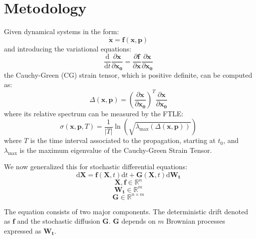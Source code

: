 \documentclass{juliacon}
\newcommand{\drv}{\textrm{d}}
\begin{document}
\section{Metodology}
Given dynamical systems in the form:
\begin{equation}
    \dot{\mathbf{x}}=\mathbf{f}(\mathbf{x}, \mathbf{p})
\end{equation}
and introducing the variational equations:
\begin{equation}
    \frac{\drv}{\drv t} \frac{\partial \mathbf{x} }{\partial \mathbf{x_0}} = \frac{\partial \mathbf{f}}{\partial \mathbf{x}}\frac{\partial \mathbf{x}}{\partial \mathbf{x_0}}
\end{equation}
the Cauchy-Green (CG) strain tensor, which is positive definite, can be computed as:
\begin{equation}
    \Delta(\mathbf{x}, \mathbf{p}) = \left( \frac{\partial \mathbf{x}}{\partial \mathbf{x_0}}\right)^T \frac{\partial \mathbf{x}}{\partial \mathbf{x_0}}
\end{equation}
where its relative spectrum can be measured by the FTLE:
\begin{equation}
    \sigma(\mathbf{x}, \mathbf{p}, T)=\frac{1}{|T|}\ln(\sqrt{\lambda_{\max}(\Delta(\mathbf{x}, \mathbf{p}))})
\end{equation}
where $T$ is the time interval associated to the propagation, starting at $t_0$, and $\lambda_{\max}$ is the maximum eigenvalue of the Cauchy-Green Strain Tensor.

We now generalized this for stochastic differential equations\cite{oksendal}:
\begin{equation}
    \drv \mathbf{X}=\mathbf{f}(\mathbf{X},t) \drv t + \mathbf{G}(\mathbf{X},t) \drv \mathbf{W_t}
\end{equation}
\begin{equation*}
   \mathbf{X},\mathbf{f} \in \mathbb{R}^{n} 
\end{equation*}
\begin{equation*}
    \mathbf{W_t} \in \mathbb{R}^{m}
\end{equation*}
\begin{equation*}
    \mathbf{G} \in \mathbb{R}^{n \times m}
\end{equation*}

The equation consists of two major components. The deterministic drift denoted as $\mathbf{f}$ and the stochastic diffusion $\mathbf{G}$. $\mathbf{G}$ depends on $m$ Brownian processes expressed as $\mathbf{W_t}$.
\end{document}
